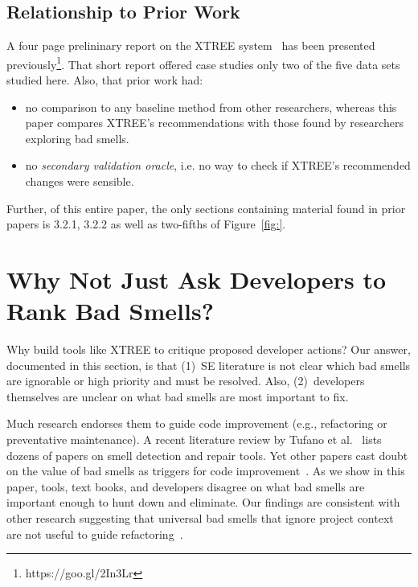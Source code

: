 \documentclass[twocolumn,5p]{elsarticle}
\newcommand{\bi}{\begin{itemize}[leftmargin=0.4cm]}
\newcommand{\ei}{\end{itemize}}
\newcommand{\tion}[1]{\S\ref{sect:#1}}
\newcommand{\fig}[1]{Figure~\ref{fig:#1}}
\theoremstyle{break}
\begin{document}
  \subsection{Relationship to Prior Work }
A four page prelininary report on the XTREE system~\cite{krishna2015actionable} has been presented previously\footnote{https://goo.gl/2In3Lr}. That short report offered case studies only two  of
the five data sets studied here. Also, that prior work had:
\bi
\item
no comparison to any baseline
method from other researchers, whereas this paper compares XTREE's recommendations
with those found by researchers exploring bad smells.
\item
no {\em secondary validation oracle}, i.e. no way to check if XTREE's recommended changes were sensible.
\ei
Further, of this entire paper, the only sections containing material
found in prior papers is 3.2.1, 3.2.2 as well as two-fifths of \fig{}.



\section{Why Not Just Ask Developers to Rank Bad Smells?}\label{sect:prelim}

Why build tools like XTREE to  critique proposed developer actions?
Our answer, documented in this section, is that (1)~SE literature is not clear which bad smells are ignorable or  high priority and must be resolved.
Also, (2)~developers themselves are unclear on what bad smells are most important to fix.
 
 
Much research endorses them to guide
code improvement (e.g., refactoring or preventative maintenance). A recent literature review by Tufano et al.~\cite{Tufano2015}  
lists dozens of papers on smell detection and repair tools. 
Yet
other papers cast doubt on the value of bad smells
as triggers for code improvement~\cite{Mantyla2004,Yamashita2013,Sjoberg2013}. 
As we show in this paper,  
 tools, text books, and developers disagree on what bad smells
are important enough to hunt down and eliminate. Our findings
are consistent with other research suggesting that universal bad
smells that ignore project context are not useful to guide refactoring~\cite{Mantyla2004,Yamashita2013,Sjoberg2013}.
\end{document}
